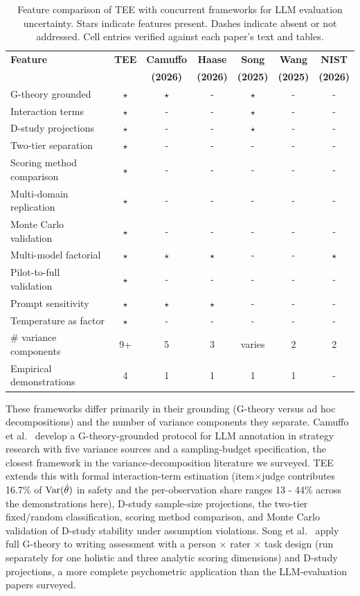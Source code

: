 \begin{table}[ht]
\centering
\caption{Feature comparison of TEE with concurrent frameworks for LLM evaluation uncertainty. Stars indicate features present. Dashes indicate absent or not addressed. Cell entries verified against each paper's text and tables.}
\label{tab:comparison}
\small
\begin{tabular}{lcccccc}
\toprule
\textbf{Feature} & \textbf{TEE} & \textbf{Camuffo} & \textbf{Haase} & \textbf{Song} & \textbf{Wang} & \textbf{NIST} \\
 & & \textbf{(2026)} & \textbf{(2026)} & \textbf{(2025)} & \textbf{(2025)} & \textbf{(2026)} \\
\midrule
G-theory grounded & $\star$ & $\star$ & - & $\star$ & - & - \\
Interaction terms & $\star$ & - & - & $\star$ & - & - \\
D-study projections & $\star$ & - & - & $\star$ & - & - \\
Two-tier separation & $\star$ & - & - & - & - & - \\
Scoring method comparison & $\star$ & - & - & - & - & - \\
Multi-domain replication & $\star$ & - & - & - & - & - \\
Monte Carlo validation & $\star$ & - & - & - & - & - \\
Multi-model factorial & $\star$ & $\star$ & $\star$ & - & - & $\star$ \\
Pilot-to-full validation & $\star$ & - & - & - & - & - \\
Prompt sensitivity & $\star$ & $\star$ & $\star$ & - & - & - \\
Temperature as factor & $\star$ & - & - & - & - & - \\
\# variance components & 9+ & 5 & 3 & varies & 2 & 2 \\
Empirical demonstrations & 4 & 1 & 1 & 1 & 1 & - \\
\bottomrule
\end{tabular}
\end{table}

These frameworks differ primarily in their grounding (G-theory versus ad hoc decompositions) and the number of variance components they separate. Camuffo et al.\ \citep{camuffo2026variance} develop a G-theory-grounded protocol for LLM annotation in strategy research with five variance sources and a sampling-budget specification, the closest framework in the variance-decomposition literature we surveyed. TEE extends this with formal interaction-term estimation (item$\times$judge contributes 16.7\% of $\operatorname{Var}(\hat\theta)$ in safety and the per-observation share ranges 13 - 44\% across the demonstrations here), D-study sample-size projections, the two-tier fixed/random classification, scoring method comparison, and Monte Carlo validation of D-study stability under assumption violations. Song et al.\ \citep{song2025gtheory} apply full G-theory to writing assessment with a person $\times$ rater $\times$ task design (run separately for one holistic and three analytic scoring dimensions) and D-study projections, a more complete psychometric application than the LLM-evaluation papers surveyed.


